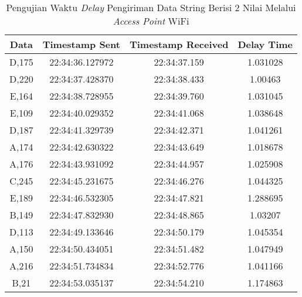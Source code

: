\begin{longtable}{|ccc|c|}
  \caption{Pengujian Waktu \emph{Delay} Pengiriman Data String Berisi 2 Nilai Melalui \emph{Access Point} WiFi}
  \label{tbl:delayWiFi2}\\
    \hline
    \multicolumn{1}{|c|}{Data}  & \multicolumn{1}{c|}{Timestamp Sent}  & Timestamp Received & Delay Time  \\ \hline
    \endfirsthead
    \endhead
    \multicolumn{1}{|c|}{D,175} & \multicolumn{1}{c|}{22:34:36.127972} & 22:34:37.159       & 1.031028    \\ \hline
    \multicolumn{1}{|c|}{D,220} & \multicolumn{1}{c|}{22:34:37.428370} & 22:34:38.433       & 1.00463     \\ \hline
    \multicolumn{1}{|c|}{E,164} & \multicolumn{1}{c|}{22:34:38.728955} & 22:34:39.760       & 1.031045    \\ \hline
    \multicolumn{1}{|c|}{E,109} & \multicolumn{1}{c|}{22:34:40.029352} & 22:34:41.068       & 1.038648    \\ \hline
    \multicolumn{1}{|c|}{D,187} & \multicolumn{1}{c|}{22:34:41.329739} & 22:34:42.371       & 1.041261    \\ \hline
    \multicolumn{1}{|c|}{A,174} & \multicolumn{1}{c|}{22:34:42.630322} & 22:34:43.649       & 1.018678    \\ \hline
    \multicolumn{1}{|c|}{A,176} & \multicolumn{1}{c|}{22:34:43.931092} & 22:34:44.957       & 1.025908    \\ \hline
    \multicolumn{1}{|c|}{C,245} & \multicolumn{1}{c|}{22:34:45.231675} & 22:34:46.276       & 1.044325    \\ \hline
    \multicolumn{1}{|c|}{E,189} & \multicolumn{1}{c|}{22:34:46.532305} & 22:34:47.821       & 1.288695    \\ \hline
    \multicolumn{1}{|c|}{B,149} & \multicolumn{1}{c|}{22:34:47.832930} & 22:34:48.865       & 1.03207     \\ \hline
    \multicolumn{1}{|c|}{D,113} & \multicolumn{1}{c|}{22:34:49.133646} & 22:34:50.179       & 1.045354    \\ \hline
    \multicolumn{1}{|c|}{A,150} & \multicolumn{1}{c|}{22:34:50.434051} & 22:34:51.482       & 1.047949    \\ \hline
    \multicolumn{1}{|c|}{A,216} & \multicolumn{1}{c|}{22:34:51.734834} & 22:34:52.776       & 1.041166    \\ \hline
    \multicolumn{1}{|c|}{B,21}  & \multicolumn{1}{c|}{22:34:53.035137} & 22:34:54.210       & 1.174863    \\ \hline

\end{longtable}
